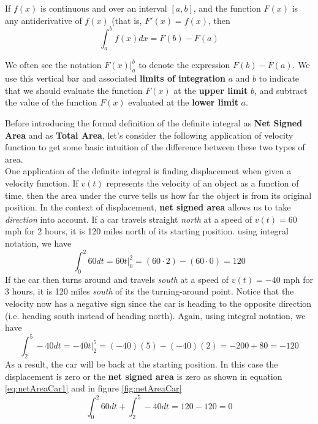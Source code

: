 \begin{tcolorbox}[title = {Review: Calculating Definite Integral using The Evaluation Theorem}]
\noindent If $f(x)$ is continuous and  over an interval $[a,b]$, and the function $F(x)$ is any antiderivative of $f(x)$ (that is, $F'(x)=f(x)$, then 
\begin{equation}\label{eq:evaluationTheorem}
\int_{a}^{b} f(x) dx = F(b)-F(a)    
\end{equation}

\noindent We often see the notation $F(x)\big|_{a}^{b}$ to denote the expression $F(b)-F(a)$. We use this vertical bar and associated \textbf{limits of integration} $a$ and $b$ to indicate that we should evaluate the function $F(x)$ at the \textbf{upper limit} $b$, and subtract the value of the function $F(x)$ evaluated at the \textbf{lower limit} $a$.
\end{tcolorbox}

\noindent Before introducing the formal definition of the definite integral as \textbf{Net Signed Area} and as \textbf{Total Area}, let's consider the following application of velocity function to get some basic intuition of the difference between these two types of area. \\

\noindent One application of the definite integral is finding displacement when given a velocity function. If $v(t)$ represents the velocity of an object as a function of time, then the area under the curve tells us how far the object is from its original position. In the context of displacement, \textbf{net signed area} allows us to take \emph{direction} into account. If a car travels straight \emph{north} at a speed of $v(t)=60$ mph for 2 hours, it is 120 miles north of its starting position. using integral notation, we have 
\begin{equation}
    \int_0^2 60 dt=60t\big|_{0}^{2}=(60\cdot 2)-(60\cdot 0)=120
\end{equation}
\noindent If the car then turns around and travels \emph{south} at a speed of $v(t)=-40$ mph for 3 hours, it is 120 miles \emph{south} of its the turning-around point. Notice that the velocity now has a negative sign since the car is heading to the opposite direction (i.e. heading south instead of heading north). Again, using integral notation, we have
\begin{equation}
    \int_2^5 -40 dt=-40t\big|_{2}^{5}=(-40)(5)-(-40)(2)=-200+80=-120
\end{equation}
\noindent As a result, the car will be back at the starting position. In this case the displacement is zero or the \textbf{net signed area} is zero as shown in equation \ref{eq:netAreaCar1} and in figure \ref{fig:netAreaCar}
\begin{equation}\label{eq:netAreaCar1}
  \int_0^2 60 dt+\int_2^5 -40 dt=120-120=0
\end{equation}

